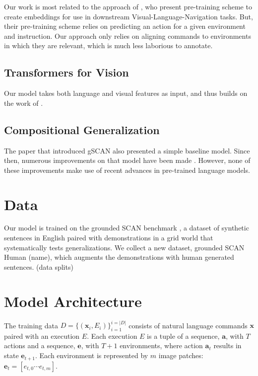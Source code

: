 \documentclass[11pt]{article}
\begin{document}
%
Our work is most related to the approach of \citet{Hao2020TowardsLA}, who present pre-training scheme to create embeddings for use in downstream Visual-Language-Navigation tasks.
%
But, their pre-training scheme relies on predicting an action for a given environment and instruction.
%
Our approach only relies on aligning commands to environments in which they are relevant, which is much less laborious to annotate.
%

\subsection{Transformers for Vision}
Our model takes both language and visual features as input, and thus builds on the work of \citep{LuViLBERT2019, tan-bansal-2019-lxmert, LiVisualBert2019}.

\subsection{Compositional Generalization}
The paper \citep{ruis2020benchmark} that introduced gSCAN also presented a simple baseline model.
%
Since then, numerous improvements on that model have been made \citep{gao-etal-2020-systematic, heinze-think-2020, kuo2020compositional}.
%
However, none of these improvements make use of recent advances in pre-trained language models. 

\section{Data}
Our model is trained on the grounded SCAN benchmark \citep{ruis2020benchmark}, a dataset of synthetic sentences in English paired with demonstrations in a grid world that systematically tests generalizations.
%
We collect a new dataset, grounded SCAN Human (\TODO name), which augments the demonstrations with human generated sentences.
%
(\TODO data splits)

\section{Model Architecture}
The training data $D=\{(\mathbf{x}_i, E_i) \}_{i=1}^{i=|D|}$ consists of natural language commands $\mathbf{x}$ paired with an execution $E$. 
%
Each execution $E$ is a tuple of a sequence, $\mathbf{a}$, with $T$ actions and a sequence, $\mathbf{e}$, with $T+1$ environments, where action $\mathbf{a}_t$ results in state  $\mathbf{e}_{t+1}$. 
%
Each environment is represented by $m$ image patches: $\mathbf{e}_{t} = [e_{t,0}\cdots e_{t,m}]$.
%
\end{document}
